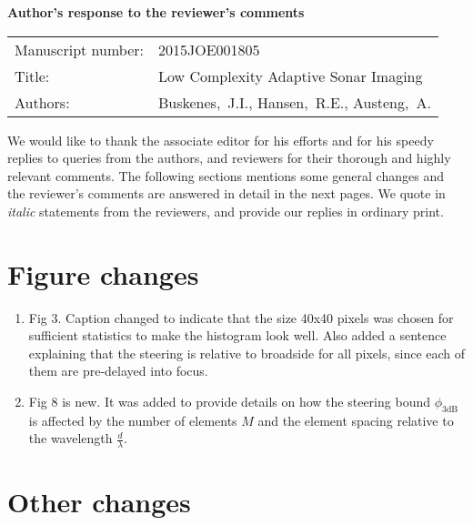 \documentclass[11pt]{article} %
\newcommand\1{\vec 1}
\begin{document}

\begin{center}\Large\bf
Author's response to the reviewer's comments
\end{center}

\begin{center}
\begin{tabular}{l p{.6\linewidth}}\centering
Manuscript number: & 2015JOE001805 \\
Title: & Low Complexity Adaptive Sonar Imaging \\
Authors: & Buskenes,~J.I., Hansen,~R.E., Austeng,~A.
\end{tabular}
\end{center}

We would like to thank the associate editor for his efforts and for his speedy replies to queries from the authors, and reviewers for their thorough and highly relevant comments. The following sections mentions some general changes and the reviewer's comments are answered in detail in the next pages. We quote in \textit{italic} statements from the reviewers, and provide our replies in ordinary print.


\section{Figure changes}

\begin{enumerate}
\item Fig 3. Caption changed to indicate that the size 40x40 pixels was chosen for sufficient statistics to make the histogram look well. Also added a sentence explaining that the steering is relative to broadside for all pixels, since each of them are pre-delayed into focus.
\item Fig 8 is new. It was added to provide details on how the steering bound $\phi_\mathrm{3dB}$ is affected by the number of elements $M$ and the element spacing relative to the wavelength $\frac{d}{\lambda}$.
\end{enumerate}


\section{Other changes}
\end{document}
